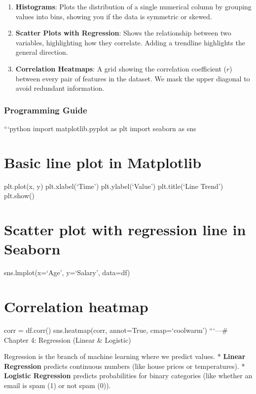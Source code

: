 \begin{enumerate}
\def\labelenumi{\arabic{enumi}.}
\tightlist
\item
  \textbf{Histograms}: Plots the distribution of a single numerical
  column by grouping values into bins, showing you if the data is
  symmetric or skewed.
\item
  \textbf{Scatter Plots with Regression}: Shows the relationship between
  two variables, highlighting how they correlate. Adding a trendline
  highlights the general direction.
\item
  \textbf{Correlation Heatmaps}: A grid showing the correlation
  coefficient (\(r\)) between every pair of features in the dataset. We
  mask the upper diagonal to avoid redundant information.
\end{enumerate}

\subsubsection{Programming Guide}\label{programming-guide-2}

```python import matplotlib.pyplot as plt import seaborn as sns

\section{Basic line plot in
Matplotlib}\label{basic-line-plot-in-matplotlib}

plt.plot(x, y) plt.xlabel(`Time') plt.ylabel(`Value') plt.title(`Line
Trend') plt.show()

\section{Scatter plot with regression line in
Seaborn}\label{scatter-plot-with-regression-line-in-seaborn}

sns.lmplot(x=`Age', y=`Salary', data=df)

\section{Correlation heatmap}\label{correlation-heatmap}

corr = df.corr() sns.heatmap(corr, annot=True, cmap=`coolwarm')
```\n\n---\n\n\# Chapter 4: Regression (Linear \& Logistic)

Regression is the branch of machine learning where we predict values. *
\textbf{Linear Regression} predicts continuous numbers (like house
prices or temperatures). * \textbf{Logistic Regression} predicts
probabilities for binary categories (like whether an email is spam (1)
or not spam (0)).

